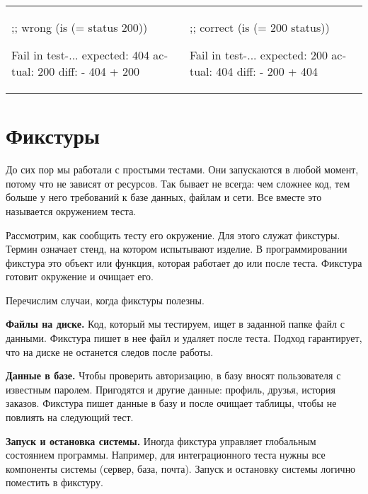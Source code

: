 \noindent
\begin{tabular}{ @{}p{5cm} @{}p{5cm} }

\begin{english}
  \begin{clojure}
;; wrong
(is (= status 200))

Fail in test-...
expected: 404
  actual: 200
    diff: - 404
          + 200
  \end{clojure}
\end{english}

&

\begin{english}
  \begin{clojure}
;; correct
(is (= 200 status))

Fail in test-...
expected: 200
  actual: 404
    diff: - 200
          + 404
  \end{clojure}
\end{english}

\end{tabular}

\section{Фикстуры}

До сих пор мы работали с простыми тестами. Они запускаются в любой момент,
потому что не зависят от ресурсов. Так бывает не всегда: чем сложнее код, тем
больше у него требований к базе данных, файлам и сети. Все вместе это называется
окружением теста.

Рассмотрим, как сообщить тесту его окружение. Для этого служат фикстуры. Термин
означает стенд, на котором испытывают изделие. В программировании фикстура это
объект или функция, которая работает до или после теста. Фикстура готовит
окружение и очищает его.

Перечислим случаи, когда фикстуры полезны.

\textbf{Файлы на диске.} Код, который мы тестируем, ищет в заданной папке файл с
данными. Фикстура пишет в нее файл и удаляет после теста. Подход гарантирует,
что на диске не останется следов после работы.

\textbf{Данные в базе.} Чтобы проверить авторизацию, в базу вносят пользователя
с известным паролем. Пригодятся и другие данные: профиль, друзья, история
заказов. Фикстура пишет данные в базу и после очищает таблицы, чтобы не повлиять
на следующий тест.

\textbf{Запуск и остановка системы.} Иногда фикстура управляет глобальным
состоянием программы. Например, для интеграционного теста нужны все компоненты
системы (сервер, база, почта). Запуск и остановку системы логично поместить в
фикстуру.

